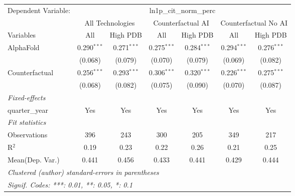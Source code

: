 \begingroup
\centering
\begin{tabular}{lcccccc}
   \tabularnewline \midrule \midrule
   Dependent Variable: & \multicolumn{6}{c}{ln1p\_cit\_norm\_perc}\\
 & \multicolumn{2}{c}{All Technologies} & \multicolumn{2}{c}{Counterfactual AI} & \multicolumn{2}{c}{Counterfactual No AI} \\
\cmidrule(lr){1-1}\cmidrule(lr){2-3} \cmidrule(lr){4-5} \cmidrule(lr){6-7}
Variables & \multicolumn{1}{c}{All} & \multicolumn{1}{c}{High PDB} & \multicolumn{1}{c}{All} & \multicolumn{1}{c}{High PDB} & \multicolumn{1}{c}{All} & \multicolumn{1}{c}{High PDB} \\
\cmidrule(lr){1-1}\cmidrule(lr){2-2} \cmidrule(lr){3-3} \cmidrule(lr){4-4} \cmidrule(lr){5-5} \cmidrule(lr){6-6} \cmidrule(lr){7-7}
   AlphaFold      & 0.290$^{***}$ & 0.271$^{***}$ & 0.275$^{***}$ & 0.284$^{***}$ & 0.294$^{***}$ & 0.276$^{***}$\\   
                  & (0.068)       & (0.079)       & (0.070)       & (0.079)       & (0.069)       & (0.082)\\   
   Counterfactual & 0.256$^{***}$ & 0.293$^{***}$ & 0.306$^{***}$ & 0.320$^{***}$ & 0.226$^{***}$ & 0.275$^{***}$\\   
                  & (0.068)       & (0.082)       & (0.075)       & (0.090)       & (0.070)       & (0.087)\\   
   \midrule
   \emph{Fixed-effects}\\
   quarter\_year  & Yes           & Yes           & Yes           & Yes           & Yes           & Yes\\  
   \midrule
   \emph{Fit statistics}\\
   Observations   & 396           & 243           & 300           & 205           & 349           & 217\\  
   R$^2$          & 0.19          & 0.23          & 0.22          & 0.26          & 0.21          & 0.25\\  
Mean(Dep. Var.) & 0.441 & 0.456 & 0.433 & 0.441 & 0.429 & 0.444 \\
   \midrule \midrule
   \multicolumn{7}{l}{\emph{Clustered (author) standard-errors in parentheses}}\\
   \multicolumn{7}{l}{\emph{Signif. Codes: ***: 0.01, **: 0.05, *: 0.1}}\\
\end{tabular}
\par\endgroup
